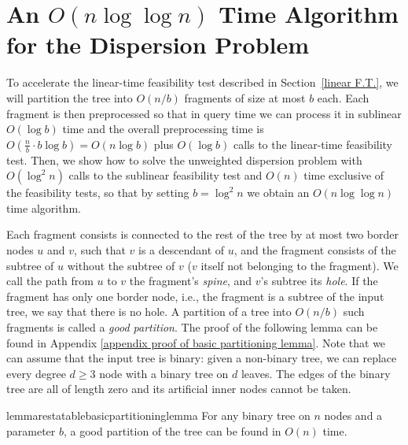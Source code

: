 \documentclass[a4paper,UKenglish]{lipics-v2016}
\theoremstyle{plain}
\begin{document}
\section{An \texorpdfstring{\boldmath$O(n\log\log n)$}{O(nloglogn)} Time Algorithm for the Dispersion Problem}
\label{sublinear f.t.}

To accelerate the linear-time feasibility test described in Section~\ref{linear F.T.}, we will partition the tree into $O(n/b)$ fragments of size at most
$b$ each. Each fragment is then preprocessed so that in query time we can process it in sublinear $O(\log b)$ time and the overall preprocessing time
is $O(\frac{n}{b}\cdot b\log b)=O(n\log b)$ plus $O(\log b)$ calls to the linear-time feasibility test.
Then, we show how to solve the unweighted dispersion problem with $O(\log^{2}n)$ calls to the sublinear
feasibility test and $O(n)$ time exclusive of the feasibility tests, so that by setting $b=\log^{2}n$ we obtain an $O(n\log\log n)$ time algorithm.

Each fragment consists is connected to the rest of the tree by at most two border nodes $u$ and $v$, such that $v$ is a
descendant of $u$, and the fragment consists of the subtree of $u$ without the subtree of $v$ ($v$ itself not belonging to
the fragment).  We call the path from $u$ to $v$ the fragment's \textit{spine}, and $v$'s subtree its \textit{hole}. If the
fragment has only one border node, i.e., the fragment is a subtree of the input tree, we say that there is no hole.
A partition of a tree into $O(n/b)$ such fragments is called a \emph{good partition}.
The proof of the following lemma can be found in Appendix \ref{appendix proof of basic partitioning lemma}.
Note that we can assume that the input tree is binary: given a non-binary tree, we can replace every degree $d\geq 3$ node with a binary tree on
$d$ leaves. The edges of the binary tree are all of length zero and its artificial inner nodes cannot be taken.

\begin{restatable}{lemmarestatable}{basicpartitioninglemma}
\label{basic partitioning lemma}
For any binary tree on $n$ nodes and a parameter $b$, a good partition of the tree can be found in $O(n)$ time.
\end{restatable}

 
\end{document}
